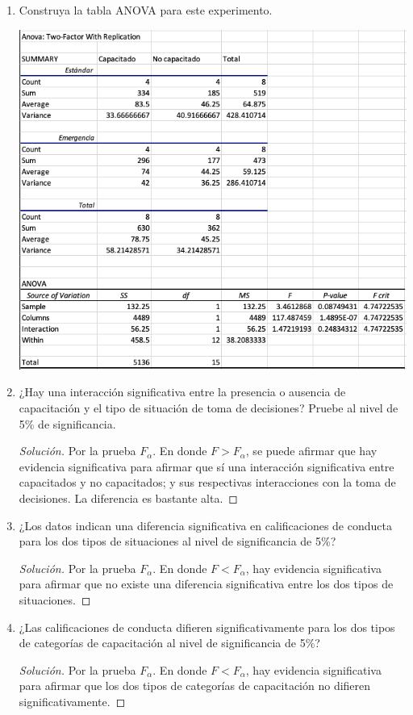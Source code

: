 \documentclass[a4paper,12pt]{article}
\newenvironment{solution}
  {\renewcommand\qedsymbol{$\blacksquare$}\begin{proof}[Solución]}
  {\end{proof}}
\begin{document}
\begin{enumerate}
\item Construya la tabla ANOVA para este experimento.
\begin{center}
    \includegraphics[scale=0.5]{Imagenes/lol.png}
\end{center}
\item ¿Hay una interacción significativa entre la presencia o ausencia de capacitación y el tipo de situación de toma de decisiones? Pruebe al nivel de 5\% de significancia.
\begin{solution}
Por la prueba $F_\alpha$. En donde $F>F_\alpha$, se puede afirmar que hay evidencia significativa para afirmar que sí una interacción significativa entre capacitados y no capacitados; y sus respectivas interacciones con la toma de decisiones. La diferencia es bastante alta. 
\end{solution}
\item ¿Los datos indican una diferencia significativa en calificaciones de conducta para los dos tipos de situaciones al nivel de significancia de 5\%?
\begin{solution}
Por la prueba $F_\alpha$. En donde $F<F_\alpha$, hay evidencia significativa para afirmar que no existe una diferencia significativa entre los dos tipos de situaciones.
\end{solution}
\item ¿Las  calificaciones  de  conducta  difieren significativamente  para  los  dos  tipos  de categorías de capacitación al nivel de significancia de 5\%?
\begin{solution}
Por la prueba $F_\alpha$. En donde $F<F_\alpha$, hay evidencia significativa para afirmar que los dos tipos de categorías de capacitación no difieren significativamente.
\end{solution}
\end{enumerate}
\end{document}
